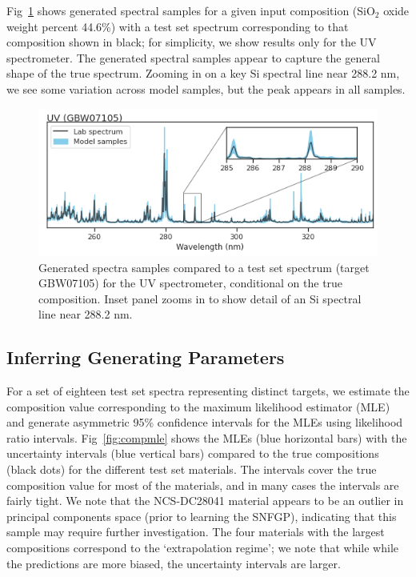 \documentclass[letterpaper]{article} %
\begin{document}
Fig~\ref{fig:genspectra} shows generated spectral samples for a given input composition (SiO$_2$ oxide weight percent 44.6\%) with a test set spectrum corresponding to that composition shown in black; for simplicity, we show results only for the UV spectrometer.
The generated spectral samples appear to capture the general shape of the true spectrum.
Zooming in on a key Si spectral line near 288.2 nm, we see some variation across model samples, but the peak appears in all samples.

\begin{figure}
    \centering
    \includegraphics[width=\linewidth]{figures/uvspectra.png}
    \caption{Generated spectra samples compared to a test set spectrum (target GBW07105) for the UV spectrometer, conditional on the true composition. Inset panel zooms in to show detail of an Si spectral line near 288.2 nm.}
    \label{fig:genspectra}
\end{figure}

\subsection{Inferring Generating Parameters}
For a set of eighteen test set spectra representing distinct targets, we estimate the composition value corresponding to the maximum likelihood estimator (MLE) and generate asymmetric 95\% confidence intervals for the MLEs using likelihood ratio intervals.
Fig~\ref{fig:compmle} shows the MLEs (blue horizontal bars) with the uncertainty intervals (blue vertical bars) compared to the true compositions (black dots) for the different test set materials.
The intervals cover the true composition value for most of the materials, and in many cases the intervals are fairly tight.
We note that the NCS-DC28041 material appears to be an outlier in principal components space (prior to learning the SNFGP), indicating that this sample may require further investigation.
The four materials with the largest compositions correspond to the `extrapolation regime'; we note that while while the predictions are more biased, the uncertainty intervals are larger.
\end{document}
